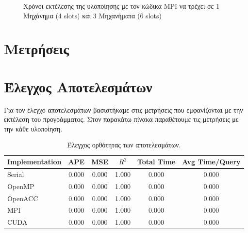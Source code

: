 \documentclass[11pt]{scrartcl} %
\begin{document}
\begin{figure}[H]
    \begin{center}
    \end{center}
    \caption{Χρόνοι εκτέλεσης της υλοποίησης με τον κώδικα MPI να τρέχει σε 1 Μηχάνημα (4 slots) και 3 Μηχανήματα (6 slots)}
    \label{fig:cluster_times}
\end{figure}

\section{Μετρήσεις}

\section{Έλεγχος Αποτελεσμάτων}

Για τον έλεγχο αποτελεσμάτων βασιστήκαμε στις μετρήσεις που εμφανίζονται με την εκτέλεση του προγράμματος.
Στον παρακάτω πίνακα παραθέτουμε τις μετρήσεις με την κάθε υλοποίηση.

\begin{table}[H]
    \centering
    \begin{tabular}{|l|c|c|c|c|c|}
    \hline
        Implementation & APE   & MSE   & $R^2$ & Total Time & Avg Time/Query \\ \hline
        Serial         & 0.000 & 0.000 & 1.000 & 0.000      & 0.000          \\
        OpenMP         & 0.000 & 0.000 & 1.000 & 0.000      & 0.000          \\
        OpenACC        & 0.000 & 0.000 & 1.000 & 0.000      & 0.000          \\
        MPI            & 0.000 & 0.000 & 1.000 & 0.000      & 0.000          \\
        CUDA           & 0.000 & 0.000 & 1.000 & 0.000      & 0.000          \\
    \hline
    \end{tabular}

    \caption{Έλεγχος ορθότητας των αποτελεσμάτων.}
\end{table}




\end{document}
